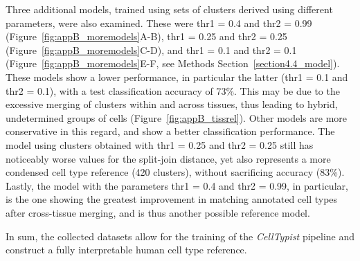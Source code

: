 Three additional models, trained using sets of clusters derived using different parameters, were also examined. These were thr1 = 0.4 and thr2 = 0.99 (Figure~\ref{fig:appB_moremodels}A-B), thr1 = 0.25 and thr2 = 0.25 (Figure~\ref{fig:appB_moremodels}C-D), and thr1 = 0.1 and thr2 = 0.1 (Figure~\ref{fig:appB_moremodels}E-F, see Methods Section~\ref{section4.4_model}). These models show a lower performance, in particular the latter (thr1 = 0.1 and thr2 = 0.1), with a test classification accuracy of 73\%. This may be due to the excessive merging of clusters within and across tissues, thus leading to hybrid, undetermined groups of cells (Figure~\ref{fig:appB_tissrel}). Other models are more conservative in this regard, and show a better classification performance. The model using clusters obtained with thr1 = 0.25 and thr2 = 0.25 still has noticeably worse values for the split-join distance, yet also represents a more condensed cell type reference (420 clusters), without sacrificing accuracy (83\%). Lastly, the model with the parameters thr1 = 0.4 and thr2 = 0.99, in particular, is the one showing the greatest improvement in matching annotated cell types after cross-tissue merging, and is thus another possible reference model.

In sum, the collected datasets allow for the training of the \textit{CellTypist} pipeline and construct a fully interpretable human cell type reference.


